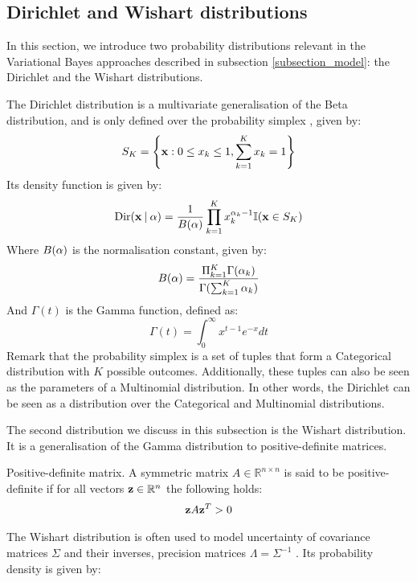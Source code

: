 \documentclass[../main.tex]{subfiles}
\begin{document}
\subsection{Dirichlet and Wishart distributions} \label{subsection_dirwish}
In this section, we introduce two probability distributions relevant in the Variational Bayes approaches described in subsection \ref{subsection_model}: the Dirichlet and the Wishart distributions. 
\par The Dirichlet distribution is a multivariate generalisation of the Beta distribution, and is only defined over the probability simplex \cite{Murphy2012}, given by:
\begin{align*}
S_K = \left\{\mathbf{x} : 0 \leq x_k \leq 1, \sum_{k=1}^Kx_k = 1\right\}
\end{align*}
Its density function is given by:
\begin{equation} \label{eq:dirichlet}
\text{Dir}(\mathbf{x} \:\vert\: \mathbf{\alpha}) = \frac{1}{B(\mathbf{\alpha})} \prod_{k=1}^Kx_k^{\alpha_k-1}\mathbb{I}(\mathbf{x}\in S_K)
\end{equation}
Where $B(\mathbf{\alpha})$ is the normalisation constant, given by:
\begin{equation}
B(\mathbf{\alpha}) = \frac{\Pi_{k=1}^K\Gamma(\alpha_k)}{\Gamma(\sum_{k=1}^K\alpha_k)}
\end{equation}
And $\Gamma(t)$ is the Gamma function, defined as:
\begin{equation}\label{eq:gamma}
\Gamma(t) = \int_0^\infty x^{t-1}e^{-x}dt
\end{equation}
Remark that the probability simplex is a set of tuples that form a Categorical distribution with $K$ possible outcomes. Additionally, these tuples can also be seen as the parameters of a Multinomial distribution. In other words, the Dirichlet can be seen as a distribution over the Categorical and Multinomial distributions.
\par The second distribution we discuss in this subsection is the Wishart distribution. It is a generalisation of the Gamma distribution to positive-definite matrices. 
\begin{definition}{Positive-definite matrix.} \label{def_pdmatrix}
A symmetric matrix $A \in \mathbb{R}^{n\times n}$ is said to be positive-definite if for all vectors $\mathbf{z} \in \mathbb{R}^n$ the following holds:
\begin{align*}
\mathbf{z}A\mathbf{z}^T > 0
\end{align*}
\end{definition}
\par The Wishart distribution is often used to model uncertainty of covariance matrices $\Sigma$ and their inverses, precision matrices $\Lambda = \Sigma^{-1}$ \cite{Murphy2012}. Its probability density is given by:
\end{document}

